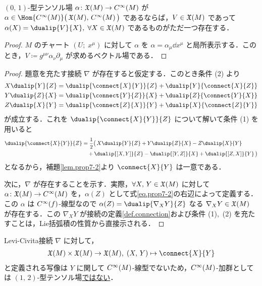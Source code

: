 \documentclass[geometry_main]{subfiles}
\begin{document}
\hrulefill

\begin{mylem}[label=lem.prop7-2]{}
	$(0,\, 1)$-型テンソル場 $\alpha \colon \mathfrak{X}(M) \to C^\infty(M)$ が $\alpha \in \Hom{\cinftyf{M}}\bigl(\, \vecfield{M},\, \cinftyf{M}\, \bigr)$ であるならば，$V \in \mathfrak{X}(M)$ であって $\alpha(X) = \dualip{V}{X},\; \forall  X \in \vecfield{M}$ であるものがただ一つ存在する．
\end{mylem}
\begin{proof} 
	$M$ のチャート $(U;\; x^\mu)$ に対して $\alpha$ を $\alpha = \alpha_\mu \dd{x^\mu}$ と局所表示する．このとき，$V \coloneqq g^{\mu\nu} \alpha_\nu \partial_\mu$ が求めるベクトル場である．
\end{proof}

\hrulefill

\begin{proof} 
	題意を充たす接続 $\nabla$ が存在すると仮定する．このとき条件 (2) より
	\begin{align} 
		X \dualip{Y}{Z} &= \dualip{\connect{X}{Y}}{Z} + \dualip{Y}{\connect{X}{Z}} \\
		Y \dualip{Z}{X} &= \dualip{\connect{Y}{Z}}{X} + \dualip{Z}{\connect{Y}{X}}\\
		Z\dualip{X}{Y} &= \dualip{\connect{Z}{X}}{Y} + \dualip{X}{\connect{Z}{Y}}
	\end{align}
	が成立する．これを $\dualip{\connect{X}{Y}}{Z}$ について解いて条件 (1) を用いると
	\begin{align} 
		\dualip{\connect{X}{Y}}{Z} &= \frac{1}{2} \bigl(\, X \dualip{Y}{Z} + Y \dualip{Z}{X} - Z\dualip{X}{Y} \\
		&\quad + \dualip{\comm{X}{Y}}{Z} - \dualip{\comm{Y}{Z}}{X} + \dualip{\comm{Z}{X}}{Y}\, \bigr)\label{eq.prop7-2}
	\end{align}
	となるから，補題\ref{lem.prop7-2}より $\connect{X}{Y}$ は一意である．

	次に，$\nabla$ が存在することを示す．実際，$\forall X,\, Y \in \mathfrak{X}(M)$ に対して $\alpha \colon  \mathfrak{X}(M) \to C^\infty(M)$ を，$\alpha(Z)$ として式\eqref{eq.prop7-2}の右辺によって定義する．この $\alpha$ は $C^\infty(f)$-線型なので $\alpha(Z) = \dualip{\nabla_X Y}{Z}$ なる $\nabla_X Y \in \mathfrak{X}(M)$ が存在する．この $\nabla_X Y$ が接続の定義\ref{def.connection}および条件 (1),\, (2) を充たすことは，Lie括弧積の性質から直接示される．
\end{proof}

Levi-Civita接続 $\nabla$ に対して，
\begin{align} 
	\vecfield{M} \times \vecfield{M} \to \vecfield{M},\; (X,\, Y) \mapsto \connect{X}{Y}
\end{align}
と定義される写像は $Y$ に関して $C^\infty(M)$-線型でないため，$C^\infty(M)$-加群としては $(1,\, 2)$-型テンソル場\underline{ではない}．
\end{document}
